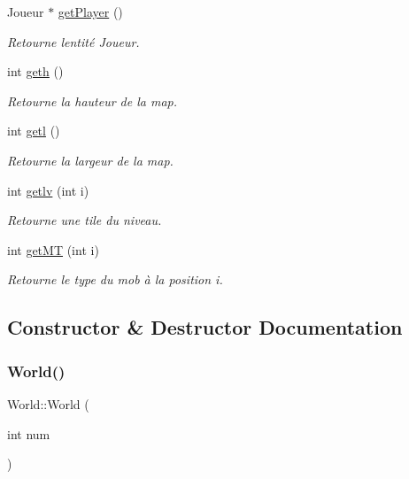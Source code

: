 \begin{DoxyCompactItemize}
Joueur $\ast$ \hyperlink{classWorld_a529077baf90f8f90b3d5b286bfa69490}{get\+Player} ()
\begin{DoxyCompactList}\small\item\em Retourne l\textquotesingle{}entité Joueur. \end{DoxyCompactList}\item 
int \hyperlink{classWorld_a641eb75c81ff846ac12104941cb2b284}{geth} ()
\begin{DoxyCompactList}\small\item\em Retourne la hauteur de la map. \end{DoxyCompactList}\item 
int \hyperlink{classWorld_a319ec8ce8b40a73bfba442a69c3bf621}{getl} ()
\begin{DoxyCompactList}\small\item\em Retourne la largeur de la map. \end{DoxyCompactList}\item 
int \hyperlink{classWorld_a2439134de6a6ca2a66539d9f7ac35f4f}{getlv} (int i)
\begin{DoxyCompactList}\small\item\em Retourne une tile du niveau. \end{DoxyCompactList}\item 
int \hyperlink{classWorld_afd3ebf8f3c57ce62653ff620a4efd3e6}{get\+MT} (int i)
\begin{DoxyCompactList}\small\item\em Retourne le type du mob à la position i. \end{DoxyCompactList}\end{DoxyCompactItemize}


\subsection{Constructor \& Destructor Documentation}
\mbox{\label{classWorld_a36ef8e67290e939d93d6b46a2e58abf2}} 
\subsubsection{\texorpdfstring{World()}{World()}\hspace{0.1cm}{\footnotesize\ttfamily [1/2]}}
{\footnotesize\ttfamily World\+::\+World (\begin{DoxyParamCaption}\item[{int}]{num }\end{DoxyParamCaption})}



